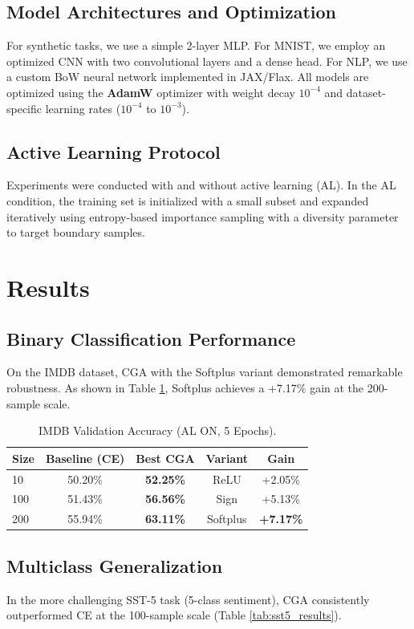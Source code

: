 \documentclass[sigconf,anonymous]{aamas}
\begin{document}
\subsection{Model Architectures and Optimization}
For synthetic tasks, we use a simple 2-layer MLP. For MNIST, we employ an optimized CNN with two convolutional layers and a dense head. For NLP, we use a custom BoW neural network implemented in JAX/Flax. All models are optimized using the \textbf{AdamW} optimizer with weight decay $10^{-4}$ and dataset-specific learning rates ($10^{-4}$ to $10^{-3}$). 

\subsection{Active Learning Protocol}
Experiments were conducted with and without active learning (AL). In the AL condition, the training set is initialized with a small subset and expanded iteratively using entropy-based importance sampling with a diversity parameter to target boundary samples.

\section{Results}
\label{sec:results}

\subsection{Binary Classification Performance}
On the IMDB dataset, CGA with the Softplus variant demonstrated remarkable robustness. As shown in Table \ref{tab:imdb_results}, Softplus achieves a +7.17\% gain at the 200-sample scale.

\begin{table}[h]
\centering
\caption{IMDB Validation Accuracy (AL ON, 5 Epochs).}
\label{tab:imdb_results}
\begin{tabular}{lcccc}
\toprule
\textbf{Size} & \textbf{Baseline (CE)} & \textbf{Best CGA} & \textbf{Variant} & \textbf{Gain} \\
\midrule
10 & 50.20\% & \textbf{52.25\%} & ReLU & +2.05\% \\
100 & 51.43\% & \textbf{56.56\%} & Sign & +5.13\% \\
200 & 55.94\% & \textbf{63.11\%} & Softplus & \textbf{+7.17\%} \\
\bottomrule
\end{tabular}
\end{table}

\subsection{Multiclass Generalization}
In the more challenging SST-5 task (5-class sentiment), CGA consistently outperformed CE at the 100-sample scale (Table \ref{tab:sst5_results}).
\end{document}
